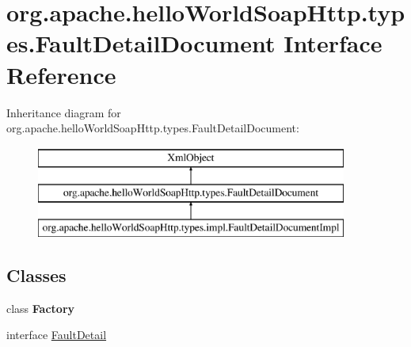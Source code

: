 \hypertarget{interfaceorg_1_1apache_1_1hello_world_soap_http_1_1types_1_1_fault_detail_document}{}\section{org.\+apache.\+hello\+World\+Soap\+Http.\+types.\+Fault\+Detail\+Document Interface Reference}
\label{interfaceorg_1_1apache_1_1hello_world_soap_http_1_1types_1_1_fault_detail_document}
Inheritance diagram for org.\+apache.\+hello\+World\+Soap\+Http.\+types.\+Fault\+Detail\+Document\+:\begin{figure}[H]
\begin{center}
\leavevmode
\includegraphics[height=3.000000cm]{interfaceorg_1_1apache_1_1hello_world_soap_http_1_1types_1_1_fault_detail_document}
\end{center}
\end{figure}
\subsection*{Classes}
\begin{DoxyCompactItemize}
\item 
class {\bfseries Factory}
\item 
interface \hyperlink{interfaceorg_1_1apache_1_1hello_world_soap_http_1_1types_1_1_fault_detail_document_1_1_fault_detail}{Fault\+Detail}
\end{DoxyCompactItemize}
